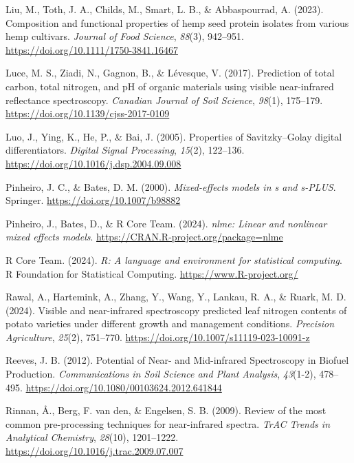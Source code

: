 \documentclass[
]{agujournal2019}
\newlength{\cslhangindent}
\newenvironment{CSLReferences}[2] %
 {\begin{list}{}{%
  \setlength{\itemindent}{0pt}
  \setlength{\leftmargin}{0pt}
  \setlength{\parsep}{0pt}
  \ifodd #1
   \setlength{\leftmargin}{\cslhangindent}
   \setlength{\itemindent}{-1\cslhangindent}
  \fi
  \setlength{\itemsep}{#2\baselineskip}}}
 {\end{list}}
\begin{document}
\begin{CSLReferences}{1}{0}
Liu, M., Toth, J. A., Childs, M., Smart, L. B., \& Abbaspourrad, A.
(2023). Composition and functional properties of hemp seed protein
isolates from various hemp cultivars. \emph{Journal of Food Science},
\emph{88}(3), 942--951. \url{https://doi.org/10.1111/1750-3841.16467}

Luce, M. S., Ziadi, N., Gagnon, B., \& Lévesque, V. (2017). Prediction
of total carbon, total nitrogen, and {pH} of organic materials using
visible near-infrared reflectance spectroscopy. \emph{Canadian Journal
of Soil Science}, \emph{98}(1), 175--179.
\url{https://doi.org/10.1139/cjss-2017-0109}

Luo, J., Ying, K., He, P., \& Bai, J. (2005). Properties of
{Savitzky}--{Golay} digital differentiators. \emph{Digital Signal
Processing}, \emph{15}(2), 122--136.
\url{https://doi.org/10.1016/j.dsp.2004.09.008}

Pinheiro, J. C., \& Bates, D. M. (2000). \emph{Mixed-effects models in s
and s-PLUS}. Springer. \url{https://doi.org/10.1007/b98882}

Pinheiro, J., Bates, D., \& R Core Team. (2024). \emph{{nlme}: Linear
and nonlinear mixed effects models}.
\url{https://CRAN.R-project.org/package=nlme}

R Core Team. (2024). \emph{{R}: A language and environment for
statistical computing}. R Foundation for Statistical Computing.
\url{https://www.R-project.org/}

Rawal, A., Hartemink, A., Zhang, Y., Wang, Y., Lankau, R. A., \& Ruark,
M. D. (2024). Visible and near-infrared spectroscopy predicted leaf
nitrogen contents of potato varieties under different growth and
management conditions. \emph{Precision Agriculture}, \emph{25}(2),
751--770. \url{https://doi.org/10.1007/s11119-023-10091-z}

Reeves, J. B. (2012). Potential of {Near}- and {Mid}-infrared
{Spectroscopy} in {Biofuel} {Production}. \emph{Communications in Soil
Science and Plant Analysis}, \emph{43}(1-2), 478--495.
\url{https://doi.org/10.1080/00103624.2012.641844}

Rinnan, Å., Berg, F. van den, \& Engelsen, S. B. (2009). Review of the
most common pre-processing techniques for near-infrared spectra.
\emph{TrAC Trends in Analytical Chemistry}, \emph{28}(10), 1201--1222.
\url{https://doi.org/10.1016/j.trac.2009.07.007}


\end{CSLReferences}
\end{document}
